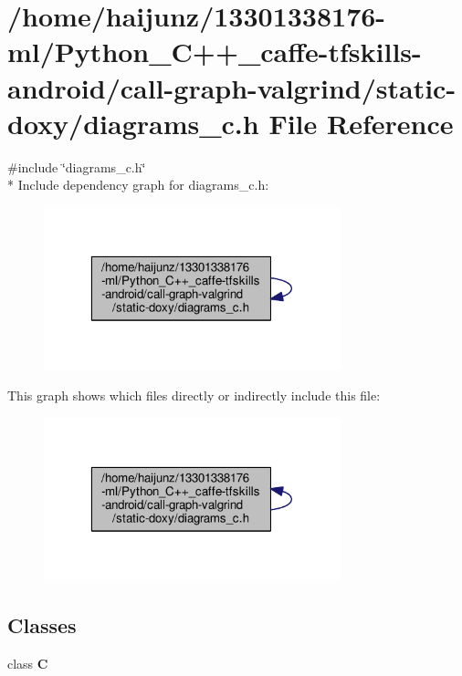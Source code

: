 \section{/home/haijunz/13301338176-\/ml/\-Python\-\_\-\-C++\-\_\-caffe-\/tfskills-\/android/call-\/graph-\/valgrind/static-\/doxy/diagrams\-\_\-c.h File Reference}
\label{diagrams__c_8h}
{\ttfamily \#include \char`\"{}diagrams\-\_\-c.\-h\char`\"{}}\\*
Include dependency graph for diagrams\-\_\-c.\-h\-:\nopagebreak
\begin{figure}[H]
\begin{center}
\leavevmode
\includegraphics[width=244pt]{diagrams__c_8h__incl}
\end{center}
\end{figure}
This graph shows which files directly or indirectly include this file\-:\nopagebreak
\begin{figure}[H]
\begin{center}
\leavevmode
\includegraphics[width=244pt]{diagrams__c_8h__dep__incl}
\end{center}
\end{figure}
\subsection*{Classes}
\begin{DoxyCompactItemize}
\item 
class {\bf C}
\end{DoxyCompactItemize}
